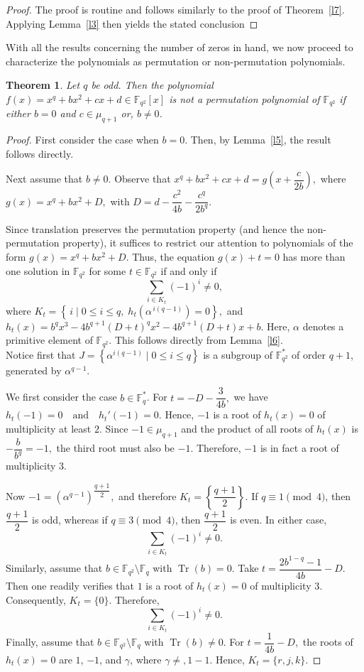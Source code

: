\documentclass[12pt]{amsart}
\newtheorem{theorem}{Theorem}[section]
\theoremstyle{definition}
\theoremstyle{remark}
\numberwithin{equation}{section}
\begin{document}
\begin{proof}
The proof is routine and follows similarly to the proof of Theorem~\ref{l7}. Applying Lemma~\ref{l3} then yields the stated conclusion
\end{proof}
With all the results concerning the number of zeros in hand, we now proceed to characterize the polynomials as permutation or non-permutation polynomials.


\begin{theorem}\label{t1}
Let $q$ be odd. Then the polynomial
$f(x)=x^q+bx^2+cx+d\in\mathbb{F}_{q^2}[x]$ is not a permutation polynomial of $\mathbb{F}_{q^2}$ if either $b=0$ and $c\in\mu_{q+1}$ or, $b\neq0$.
\end{theorem}

\begin{proof}
First consider the case when $b=0$. Then, by Lemma~\ref{l5}, the result follows directly.

Next assume that $b\neq 0$. Observe that
$
x^q+bx^2+cx+d = g\!\left(x+\dfrac{c}{2b}\right),
$
where
$
g(x)=x^q+bx^2+D,
$
with
$
D=d-\dfrac{c^2}{4b}-\dfrac{c^q}{2b^q}.
$


Since translation preserves the permutation property (and hence the non-permutation property), it suffices to restrict our attention to polynomials of the form $g(x)=x^q+bx^2+D$.
Thus, the equation
$
g(x)+t=0
$
has more than one solution in $\mathbb{F}_{q^2}$ for some $t\in \mathbb{F}_{q^2}$ if and only if
$$
\sum_{i\in K_t} (-1)^i \neq 0,
$$
 where
$
K_t=\left\{\, i \mid 0\leq i\leq q,\; h_t\!\left(\alpha^{\,i(q-1)}\right)=0 \right\},
$
and
$
h_t(x)=b^q x^3-4b^{q+1}(D+t)^q x^2-4b^{q+1}(D+t)x+b.
$
Here, $\alpha$ denotes a primitive element of $\mathbb{F}_{q^2}$. This follows directly from Lemma~\ref{l6}.\\
Notice first that
$
J=\left\{\alpha^{i(q-1)} \mid 0\leq i\leq q \right\}
$
is a subgroup of $\mathbb{F}_{q^2}^{*}$ of order $q+1$, generated by $\alpha^{q-1}$.

We first consider the case $b\in \mathbb{F}_q^{*}$. For
$
t=-D-\dfrac{3}{4b},
$
we have
$
h_t(-1)=0
\quad\text{and}\quad
h_t'(-1)=0.
$
Hence, $-1$ is a root of $h_t(x)=0$ of multiplicity at least $2$. Since $-1\in \mu_{q+1}$ and the product of all roots of $h_t(x)$ is
$
-\dfrac{b}{b^q}=-1,
$
the third root must also be $-1$. Therefore, $-1$ is in fact a root of multiplicity $3$.

Now
$
-1=(\alpha^{q-1})^{\dfrac{q+1}{2}},
$
and therefore
$
K_t=\left\{\dfrac{q+1}{2}\right\}.
$
If $q\equiv 1 \pmod 4$, then $\dfrac{q+1}{2}$ is odd, whereas if $q\equiv 3 \pmod 4$, then $\dfrac{q+1}{2}$ is even. In either case,
$$
\sum_{i\in K_t} (-1)^i \neq 0.
$$
Similarly, assume that $b\in \mathbb{F}_{q^2}\setminus \mathbb{F}_q$ with $\operatorname{Tr}(b)=0$. Take
$
t=\dfrac{2b^{1-q}-1}{4b}-D.
$
Then one readily verifies that $1$ is a root of $h_t(x)=0$ of multiplicity $3$. Consequently,
$
K_t=\{0\}.
$
Therefore,
$$
\sum_{i\in K_t} (-1)^i \neq 0.
$$
Finally, assume that $b\in \mathbb{F}_{q^2}\setminus \mathbb{F}_q$ with $\operatorname{Tr}(b)\neq 0$. For
$
t=\dfrac{1}{4b}-D,
$
the roots of $h_t(x)=0$ are $1$, $-1$, and $\gamma$, where $\gamma\neq ,1-1$. Hence,
$
K_t=\{r,j,k\}.
$


\end{proof}
\end{document}
